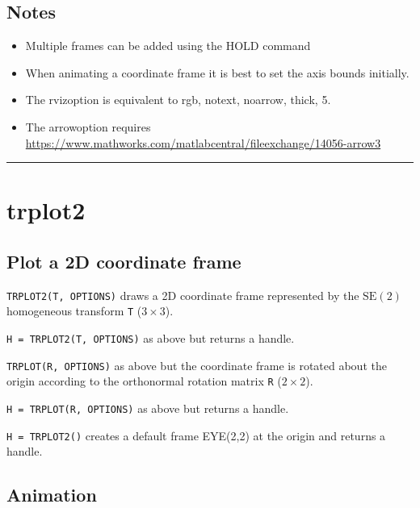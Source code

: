 \subsection*{Notes}
\begin{itemize}
  \item Multiple frames can be added using the HOLD command
  \item When animating a coordinate frame it is best to set the axis bounds initially.
  \item The \textquotesingle rviz\textquotesingle  option is equivalent to \textquotesingle rgb\textquotesingle , \textquotesingle notext\textquotesingle , \textquotesingle noarrow\textquotesingle ,    \textquotesingle thick\textquotesingle , 5.
  \item The \textquotesingle arrow\textquotesingle  option requires \url{https://www.mathworks.com/matlabcentral/fileexchange/14056-arrow3}
\end{itemize}
\vspace{1.5ex}\rule{\textwidth}{1mm}

\hypertarget{trplot2}{\section*{trplot2}}
\subsection*{Plot a 2D coordinate frame}


\texttt{TRPLOT2(T, OPTIONS)} draws a 2D coordinate frame represented by the $\mbox{SE}(2)$
homogeneous transform \texttt{T} ($3 \times 3$).



\texttt{H = TRPLOT2(T, OPTIONS)} as above but returns a handle.



\texttt{TRPLOT(R, OPTIONS)} as above but the coordinate frame is rotated about the
origin according to the orthonormal rotation matrix \texttt{R} ($2 \times 2$).



\texttt{H = TRPLOT(R, OPTIONS)} as above but returns a handle.



\texttt{H = TRPLOT2()} creates a default frame EYE(2,2) at the origin and returns a
handle.


\subsection*{Animation}


